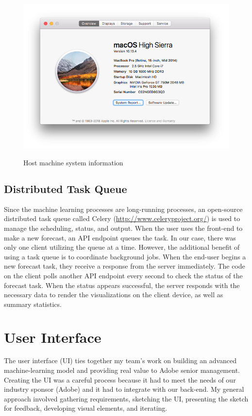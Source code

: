 \documentclass[11pt, oneside]{article}
\begin{document}
\begin{figure}[h]
  \caption{Host machine system information}
  \centering
  \includegraphics[width=12.5cm]{images/System_Specs.png}
  \label{fig:System_Specs}
\end{figure}

\subsection{Distributed Task Queue}
Since the machine learning processes are long-running processes, an open-source distributed task queue called Celery (\url{http://www.celeryproject.org/}) is used to manage the scheduling, status, and output. When the user uses the front-end to make a new forecast, an API endpoint queues the task. In our case, there was only one client utilizing the queue at a time. However, the additional benefit of using a task queue is to coordinate background jobs. When the end-user begins a new forecast task, they receive a response from the server immediately. The code on the client polls another API endpoint every second to check the status of the forecast task. When the status appears successful, the server responds with the necessary data to render the visualizations on the client device, as well as summary statistics.

\section{User Interface}
\label{user_interface}
The user interface (UI) ties together my team's work on building an advanced machine-learning model and providing real value to Adobe senior management. Creating the UI was a careful process because it had to meet the needs of our industry sponsor (Adobe) and it had to integrate with our back-end. My general approach involved gathering requirements, sketching the UI, presenting the sketch for feedback, developing visual elements, and iterating.
\end{document}
